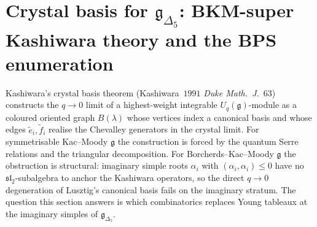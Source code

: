 \section{Crystal basis for \texorpdfstring{$\mathfrak g_{\Delta_5}$}{g-Delta-5}: BKM-super
Kashiwara theory and the BPS enumeration}
\label{sec:k3qt-crystal-basis-g-delta5}

Kashiwara's crystal basis theorem (Kashiwara~$1991$
\emph{Duke Math.~J.}~$63$) constructs the $q \to 0$ limit of a
highest-weight integrable $U_q(\mathfrak g)$-module as a coloured
oriented graph $B(\lambda)$ whose vertices index a canonical basis and
whose edges $\tilde e_i, \tilde f_i$ realise the Chevalley generators
in the crystal limit. For symmetrisable Kac--Moody $\mathfrak g$ the
construction is forced by the quantum Serre relations and the
triangular decomposition. For Borcherds--Kac--Moody $\mathfrak g$ the
obstruction is structural: imaginary simple roots $\alpha_i$ with
$(\alpha_i, \alpha_i) \leq 0$ have no $\mathfrak{sl}_2$-subalgebra to
anchor the Kashiwara operators, so the direct $q \to 0$ degeneration
of Lusztig's canonical basis fails on the imaginary stratum.
The question this section answers is which combinatorics replaces
Young tableaux at the imaginary simples of $\mathfrak g_{\Delta_5}$.


